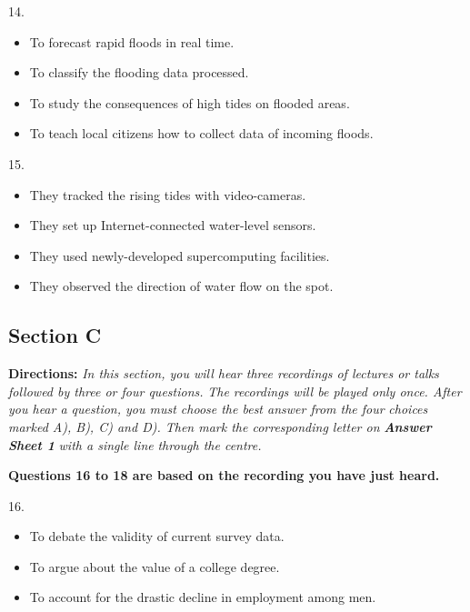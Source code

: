 \documentclass[UTF8,11pt]{ctexart}
\begin{document}
14.


\begin{itemize}[leftmargin=2em,itemsep=.2em,topsep=.4em]\item[A.] To forecast rapid floods in real time.
\item[B.] To classify the flooding data processed.
\item[C.] To study the consequences of high tides on flooded areas.
\item[D.] To teach local citizens how to collect data of incoming floods.
\end{itemize}

15.


\begin{itemize}[leftmargin=2em,itemsep=.2em,topsep=.4em]\item[A.] They tracked the rising tides with video-cameras.
\item[B.] They set up Internet-connected water-level sensors.
\item[C.] They used newly-developed supercomputing facilities.
\item[D.] They observed the direction of water flow on the spot.
\end{itemize}

\subsection*{\textbf{Section C}}


\textbf{Directions:}\textit{ In this section, you will hear three recordings of lectures or talks followed by three or four questions.} \textit{The recordings will be played only once. After you hear a question, you must choose the best answer from the four} \textit{choices marked A), B), C) and D). Then mark the corresponding letter on }\textbf{\textit{Answer Sheet 1}}\textit{ with a single line} \textit{through the centre.}


\textbf{Questions 16 to 18 are based on the recording you have just heard.}


16.


\begin{itemize}[leftmargin=2em,itemsep=.2em,topsep=.4em]\item[A.] To debate the validity of current survey data.
\item[B.] To argue about the value of a college degree.
\item[C.] To account for the drastic decline in employment among men.
\end{itemize}
\end{document}
